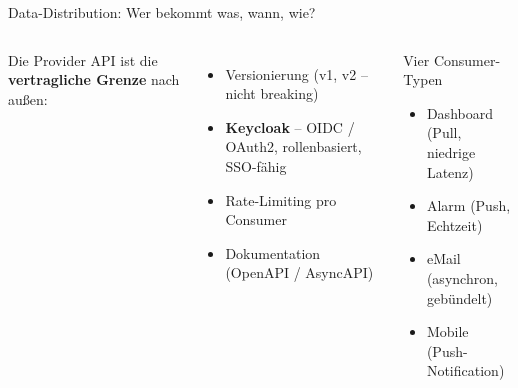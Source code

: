 \documentclass[aspectratio=169]{beamer}
\begin{document}
\begin{frame}{Data-Distribution: Wer bekommt was, wann, wie?}
  \begin{columns}
      Die Provider API ist die \textbf{vertragliche Grenze}
      nach außen:
      \begin{itemize}
        \item Versionierung (v1, v2 – nicht breaking)
        \item \textbf{Keycloak} – OIDC / OAuth2, rollenbasiert, SSO-fähig
        \item Rate-Limiting pro Consumer
        \item Dokumentation (OpenAPI / AsyncAPI)
      \end{itemize}
      \begin{block}{Vier Consumer-Typen}
        \begin{itemize}
          \item Dashboard (Pull, niedrige Latenz)
          \item Alarm (Push, Echtzeit)
          \item eMail (asynchron, gebündelt)
          \item Mobile (Push-Notification)
        \end{itemize}
      \end{block}
  \end{columns}
\end{frame}
\end{document}
